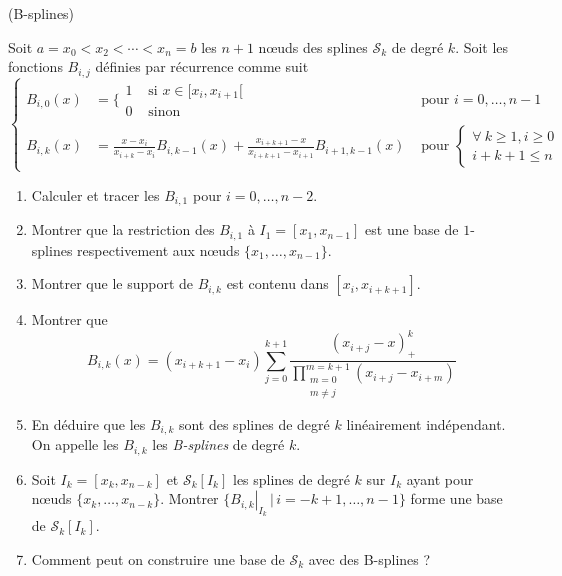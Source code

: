 \documentclass[a4paper,12pt,reqno]{amsart}
\begin{document}
\begin{exo} (B-splines)

  Soit $a=x_{0}<x_{2}<\cdots<x_{n}=b$ les $n+1$ nœuds des splines $\mathcal{S}_{k}$ de degré $k$. Soit les fonctions $B_{i,j}$ définies par récurrence comme suit
    $$
      \left\{
      \begin{array}{rll}
        B_{i,0}(x) & =
          \Bigg\{
          \begin{array}{rl}
            1 & \text{ si } x \in [x_{i},x_{i+1}[\\
            0 & \text{ sinon }
          \end{array}               & \text{ pour } i=0,\ldots,n-1\\[3ex]
        B_{i,k}(x) & = \frac{x-x_{i}}{x_{i+k}-x_{i}}B_{i,k-1}(x)
                  + \frac{x_{i+k+1}-x}{x_{i+k+1}-x_{i+1}}B_{i+1,k-1}(x)
                                    & \text{ pour }
                                      \left\{
                                        \begin{array}{r}
                                          \forall\ k \geq 1, i \geq 0\\
                                           i+k+1 \leq n
                                        \end{array}
                                      \right.
      \end{array}
      \right.
    $$\vspace{0pt}
  \begin{enumerate}
    \item Calculer et tracer les $B_{i,1}$ pour $i=0,\ldots,n-2$.
    \item Montrer que la restriction des $B_{i,1}$ à $I_{1}=[x_{1},x_{n-1}]$ est une base de $1$-splines respectivement aux nœuds $\{x_{1},\ldots,x_{n-1}\}$.
    \item Montrer que le support de $B_{i,k}$ est contenu dans $[x_{i},x_{i+k+1}]$.
    \item Montrer que
      $$
        B_{i,k}(x) = (x_{i+k+1}-x_{i})
            \sum_{j=0}^{k+1}
              \frac{(x_{i+j}-x)_{+}^{k}}{\displaystyle\prod_{\substack{m=0 \\ m\neq j}}^{m=k+1}(x_{i+j}-x_{i+m})}
      $$
    \item En déduire que les $B_{i,k}$ sont des splines de degré $k$ linéairement indépendant.\newline
      On appelle les $B_{i,k}$ les \emph{B-splines} de degré $k$.
    \item Soit $I_{k}=[x_{k},x_{n-k}]$ et  $\mathcal{S}_{k}[I_{k}]$ les splines de degré $k$ sur $I_{k}$ ayant pour nœuds $\{x_{k},\ldots,x_{n-k}\}$. Montrer $\{\left.B_{i,k}\right|_{I_{k}} \,|\, i=-k+1,\ldots,n-1 \}$ forme une base de $\mathcal{S}_{k}[I_{k}]$.
    \item Comment peut on construire une base de $\mathcal{S}_{k}$ avec des B-splines ?
  \end{enumerate}
\end{exo}
\end{document}

